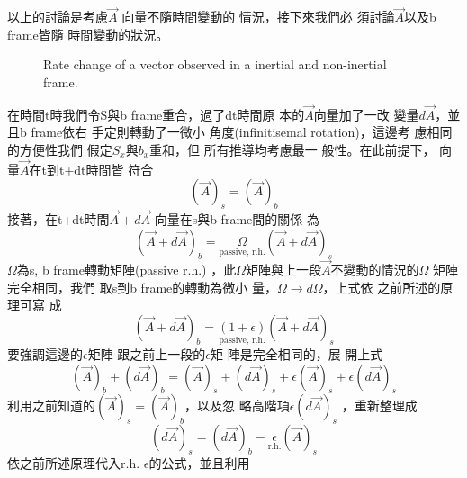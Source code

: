 \documentclass[12pt,a4paper]{article}
\begin{document}
以上的討論是考慮$\vec{A}$%
向量不隨時間變動的%
情況，接下來我們必%
須討論$\vec{A}$以及b frame皆隨%
時間變動的狀況。

\bigskip 
\begin{figure}[th]
\caption{Rate change of a vector observed in a inertial and non-inertial
frame.}
\begin{center}
\fbox{}
\end{center}
\label{ratevecfig}
\end{figure}

\bigskip 在時間t時我們令S與b
frame重合，過了dt時間原%
本的$\vec{A}$向量加了一改%
變量$d\vec{A}$，並且b frame依右%
手定則轉動了一微小%
角度(infinitisemal rotation)，這邊考%
慮相同的方便性我們%
假定$S_{x}$與$b_{x}$重和，但%
所有推導均考慮最一%
般性。在此前提下，%
向量$\vec{A}$在t到t+dt時間皆%
符合%
\begin{equation*}
\left( \vec{A}\right) _{s}=\left( \vec{A}\right) _{b}
\end{equation*}%
接著，在t+dt時間$\vec{A}+d\vec{A}$%
向量在s與b frame間的關係%
為%
\begin{equation*}
\left( \vec{A}+d\vec{A}\right) _{b}=\underset{\text{passive, r.h.}}{\Omega }%
\left( \vec{A}+d\vec{A}\right) _{s}
\end{equation*}%
$\Omega $為s, b frame轉動矩陣(passive r.h.)%
，此$\Omega $矩陣與上一段$%
\vec{A}$不變動的情況的$\Omega $%
矩陣完全相同，我們%
取s到b frame的轉動為微小%
量，$\Omega \rightarrow d\Omega $，上式依%
之前所述的原理可寫%
成%
\begin{equation*}
\left( \vec{A}+d\vec{A}\right) _{b}=\underset{\text{passive, r.h.}}{\left(
1+\epsilon \right) }\left( \vec{A}+d\vec{A}\right) _{s}
\end{equation*}%
要強調這邊的$\epsilon $矩陣%
跟之前上一段的$\epsilon $矩%
陣是完全相同的，展%
開上式%
\begin{equation*}
\left( \vec{A}\right) _{b}+\left( d\vec{A}\right) _{b}=\left( \vec{A}\right)
_{s}+\left( d\vec{A}\right) _{s}+\epsilon \left( \vec{A}\right)
_{s}+\epsilon \left( d\vec{A}\right) _{s}
\end{equation*}%
利用之前知道的$\left( \vec{A}%
\right) _{s}=\left( \vec{A}\right) _{b}$，以及忽%
略高階項$\epsilon \left( d\vec{A}\right) _{s}$%
，重新整理成%
\begin{equation*}
\left( d\vec{A}\right) _{s}=\left( d\vec{A}\right) _{b}-\underset{\text{r.h.}%
}{\epsilon }\left( \vec{A}\right) _{s}
\end{equation*}%
依之前所述原理代入r.h. 
$\epsilon $的公式，並且利用%
\end{document}
